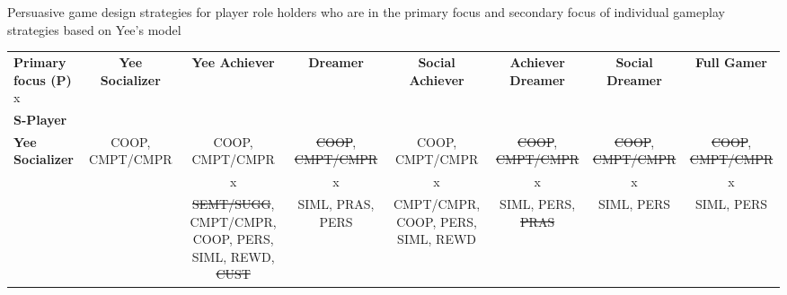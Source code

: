 \newpage
\begin{landscape}

\begin{quadro}[htb]
\caption{Persuasive game design strategies for player role holders who are in the primary focus and secondary focus of individual gameplay strategies based on Yee's model}
\label{tab:pgds-cognitive-apprenticeship-yee-model}
\centering
\tiny
\begin{tabular}{|l|c|c|c|c|c|c|c|}
\hline
\multirow{1}{*}{\textbf{Primary focus (P)} x}&
\multirow{2}{*}{\textbf{Yee Socializer}}&
\multirow{2}{*}{\textbf{Yee Achiever}}&
\multirow{2}{*}{\textbf{Dreamer}}&
\multirow{2}{*}{\textbf{Social Achiever}}&
\multirow{2}{*}{\textbf{Achiever Dreamer}}&
\multirow{2}{*}{\textbf{Social Dreamer}}&
\multirow{2}{*}{\textbf{Full Gamer}}\tabularnewline
\multirow{1}{*}{\textbf{S-Player}}&
&
&
&
&
&
&
\tabularnewline
\hline\hline
%
\multirow{3}{*}{\textbf{Yee Socializer}}& 
\multicolumn{1}{|p{2.5cm}|}{\centering COOP, CMPT/CMPR}&%
\multicolumn{1}{|p{2.5cm}|}{\centering COOP, CMPT/CMPR}&%
\multicolumn{1}{|p{2.5cm}|}{\centering \st{COOP}, \st{CMPT/CMPR}}&%
\multicolumn{1}{|p{2.5cm}|}{\centering COOP, CMPT/CMPR}&%
\multicolumn{1}{|p{2.5cm}|}{\centering \st{COOP}, \st{CMPT/CMPR}}&%
\multicolumn{1}{|p{2.5cm}|}{\centering \st{COOP}, \st{CMPT/CMPR}}&%
\multicolumn{1}{|p{2.5cm}|}{\centering \st{COOP}, \st{CMPT/CMPR}}\tabularnewline
& 
&
\multicolumn{1}{|p{2.5cm}|}{\centering x}&
\multicolumn{1}{|p{2.5cm}|}{\centering x}&
\multicolumn{1}{|p{2.5cm}|}{\centering x}&
\multicolumn{1}{|p{2.5cm}|}{\centering x}&
\multicolumn{1}{|p{2.5cm}|}{\centering x}&
\multicolumn{1}{|p{2.5cm}|}{\centering x}\tabularnewline
& 
&%
\multicolumn{1}{|p{2.5cm}|}{\centering \mbox{\st{SEMT/SUGG}}, \mbox{CMPT/CMPR}, COOP, PERS, SIML, REWD, \st{CUST}}&%
\multicolumn{1}{|p{2.5cm}|}{\centering SIML, PRAS, PERS}&%
\multicolumn{1}{|p{2.5cm}|}{\centering CMPT/CMPR, COOP, PERS, SIML, REWD}&%
\multicolumn{1}{|p{2.5cm}|}{\centering SIML, PERS, \st{PRAS}}&%
\multicolumn{1}{|p{2.5cm}|}{\centering SIML, PERS}&%
\multicolumn{1}{|p{2.5cm}|}{\centering SIML, PERS}\tabularnewline
\hline


\end{tabular}
\end{quadro}
\end{landscape}
